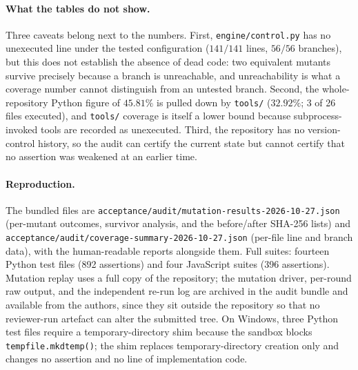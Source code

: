 \paragraph{What the tables do not show.} Three caveats belong next to the
numbers. First, \texttt{engine/control.py} has no unexecuted line under the
tested configuration ($141/141$ lines, $56/56$ branches), but this does not
establish the absence of dead code: two equivalent mutants survive precisely
because a branch is unreachable, and unreachability is what a coverage number
cannot distinguish from an untested branch. Second, the whole-repository Python
figure of $45.81\%$ is pulled down by \texttt{tools/} ($32.92\%$; 3 of 26 files
executed), and \texttt{tools/} coverage is itself a lower bound because
subprocess-invoked tools are recorded as unexecuted. Third, the repository has
no version-control history, so the audit can certify the current state but
cannot certify that no assertion was weakened at an earlier time.

\paragraph{Reproduction.} The bundled files are
\texttt{acceptance/\allowbreak{}audit/\allowbreak{}mutation-\allowbreak{}results-\allowbreak{}2026-\allowbreak{}10-\allowbreak{}27.\allowbreak{}json} (per-mutant outcomes,
survivor analysis, and the before/after SHA-256 lists) and
\texttt{acceptance/\allowbreak{}audit/\allowbreak{}coverage-\allowbreak{}summary-\allowbreak{}2026-\allowbreak{}10-\allowbreak{}27.\allowbreak{}json} (per-file line and
branch data), with the human-readable reports alongside them. Full suites:
fourteen Python test files (892 assertions) and four JavaScript suites (396
assertions). Mutation replay uses a full copy of the repository; the mutation
driver, per-round raw output, and the independent re-run log are archived in the
audit bundle and available from the authors, since they sit outside the
repository so that no reviewer-run artefact can alter the submitted tree. On
Windows, three Python test files require a temporary-directory shim because the
sandbox blocks \texttt{tempfile.\allowbreak{}mkdtemp()}; the shim replaces temporary-directory
creation only and changes no assertion and no line of implementation code.
